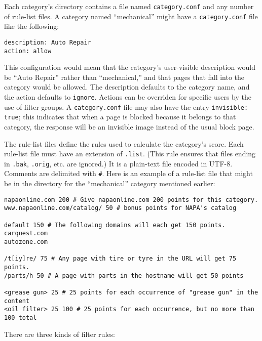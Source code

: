 \documentclass{article}
\begin{document}
Each category's directory contains a file named \verb"category.conf" and any number of rule-list files. 
A category named ``mechanical'' might have a \verb"category.conf" file like the following:

\begin{verbatim}
description: Auto Repair
action: allow
\end{verbatim}

This configuration would mean that the category's user-visible description would be 
``Auto Repair'' rather than ``mechanical,'' and that pages that fall into the category would be allowed. 
The description defaults to the category name, and the action 
defaults to \verb"ignore". Actions can be overriden for specific users by the use of filter groups.
A \verb"category.conf" file may also have the entry \verb"invisible: true"; 
this indicates that when a page is blocked because it belongs to that category,
the response will be an invisible image instead of the usual block page.

The rule-list files define the rules used to calculate the category's score. 
Each rule-list file must have an extension of \verb".list". 
(This rule ensures that files ending in \verb".bak", \verb".orig", etc. are ignored.) 
It is a plain-text file encoded in UTF-8. Comments are delimited with \verb"#". 
Here is an example of a rule-list file that might be in the directory for the 
``mechanical'' category mentioned earlier:

\begin{verbatim}
napaonline.com 200 # Give napaonline.com 200 points for this category.
www.napaonline.com/catalog/ 50 # bonus points for NAPA's catalog

default 150 # The following domains will each get 150 points.
carquest.com
autozone.com

/t[iy]re/ 75 # Any page with tire or tyre in the URL will get 75 points.
/parts/h 50 # A page with parts in the hostname will get 50 points

<grease gun> 25 # 25 points for each occurrence of "grease gun" in the content
<oil filter> 25 100 # 25 points for each occurrence, but no more than 100 total
\end{verbatim}

There are three kinds of filter rules:
\end{document}
